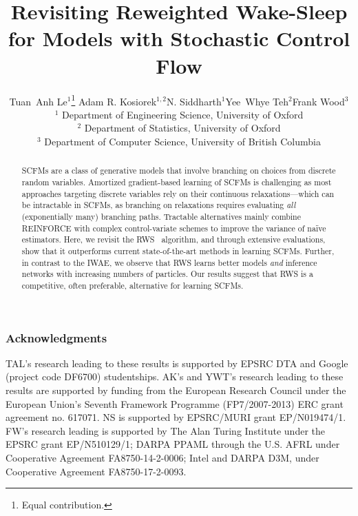 \documentclass[letterpaper]{article}
\title{Revisiting Reweighted Wake-Sleep \\[0.5ex]
for Models with Stochastic Control Flow}
\author{
  Tuan~Anh Le$^1$\thanks{\quad Equal contribution.} \quad Adam R. Kosiorek$^{1, 2}$\footnotemark[1] \quad N. Siddharth$^1$\quad Yee~Whye Teh$^2$\quad Frank Wood$^3$\\
  $^1$ Department of Engineering Science, University of Oxford \\
  $^2$ Department of Statistics, University of Oxford \\
  $^3$ Department of Computer Science, University of British Columbia
}
\begin{document}
\maketitle

\begin{abstract}
  \Glspl{SCFM} are a class of generative models that involve branching on choices from discrete random variables.
  Amortized gradient-based learning of \glspl{SCFM} is challenging as most approaches targeting discrete variables rely on their continuous relaxations---which can be intractable in \glspl{SCFM}, as branching on relaxations requires evaluating \emph{all} (exponentially many) branching paths.
  Tractable alternatives mainly combine \acrshort{REINFORCE} with complex control-variate schemes to improve the variance of na\"ive estimators.
  Here, we revisit the \gls{RWS}~\citep{bornschein2015reweighted} algorithm, and through extensive evaluations, show that it outperforms current state-of-the-art methods in learning \glspl{SCFM}.
  Further, in contrast to the \acrlong{IWAE}, we observe that \gls{RWS} learns better models \emph{and} inference networks with increasing numbers of particles.
  Our results suggest that \gls{RWS} is a competitive, often preferable, alternative for learning \glspl{SCFM}.
\end{abstract}

\glsresetall






\subsubsection*{Acknowledgments}

TAL's research leading to these results is supported by EPSRC DTA and Google (project code DF6700) studentships.
AK's and YWT's research leading to these results are supported by funding from the European Research Council under the European Union’s Seventh Framework Programme (FP7/2007-2013) ERC grant agreement no. 617071.
NS is supported by EPSRC/MURI grant EP/N019474/1.
FW's research leading is supported by The Alan Turing Institute under the EPSRC grant EP/N510129/1; DARPA PPAML through the U.S. AFRL under Cooperative Agreement FA8750-14-2-0006; Intel and DARPA D3M, under Cooperative Agreement FA8750-17-2-0093.

\clearpage
\newpage

\renewcommand*{\bibfont}{\small}


\balance

\clearpage
\newpage
\appendix

\end{document}
